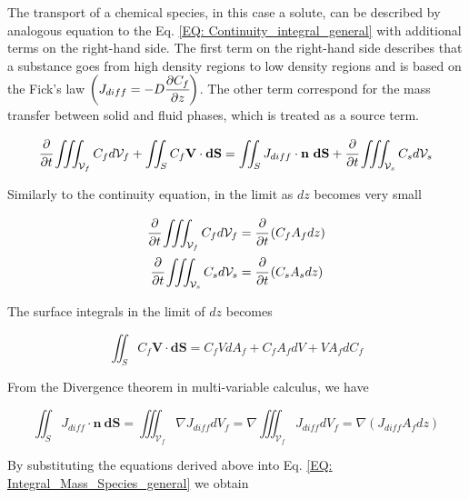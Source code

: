 \documentclass[../Parameter_fitting.tex]{subfiles}
\begin{document}
	The transport of a chemical species, in this case a solute, can be described by analogous equation to the Eq. \ref{EQ: Continuity_integral_general} with additional terms on the right-hand side. The first term on the right-hand side describes that a substance goes from high density regions to low density regions and is based on the Fick's law ${\footnotesize\left( J_{diff}=-D\cfrac{\partial C_f}{\partial z} \right)}$. The other term correspond for the mass transfer between solid and fluid phases, which is treated as a source term.
	
	{\footnotesize
		\begin{equation}
			\cfrac{\partial}{\partial t} \iiint_{\mathcal{V}_f} C_f d\mathcal{V}_f + \iint_S C_f \textbf{V} \cdot \textbf{dS} = \iint_S J_{diff} \cdot \textbf{n}~\textbf{dS} + \cfrac{\partial}{\partial t} \iiint_{\mathcal{V}_s} C_s d\mathcal{V}_s
			\label{EQ: Integral_Mass_Species_general}
		\end{equation}
	}
	
	Similarly to the continuity equation, in the limit as $dz$ becomes very small
	
	{\footnotesize
		\begin{align}
			\cfrac{\partial}{\partial t} \iiint_{\mathcal{V}_f} C_f d\mathcal{V}_f &= \cfrac{\partial}{\partial t}\left( C_f A_f dz \right) \\
			\cfrac{\partial}{\partial t} \iiint_{\mathcal{V}_s} C_s d\mathcal{V}_s &= \cfrac{\partial}{\partial t}\left( C_s A_s dz \right)
		\end{align}
	}

	The surface integrals in the limit of $dz$ becomes
	
	{\footnotesize
		\begin{equation}
			\iint_S C_f \textbf{V} \cdot \textbf{dS} = C_f V dA_f + C_f A_f dV + V A_f dC_f 
		\end{equation}
	}
	
	From the Divergence theorem in multi-variable calculus, we have
	
	{\footnotesize
		\begin{equation}
			\iint_S J_{diff} \cdot \textbf{n}~\textbf{dS} = \iiint_{\mathcal{V}_f} \nabla J_{diff} dV_f = \nabla \iiint_{\mathcal{V}_f} J_{diff} dV_f = \nabla \left( J_{diff} A_f dz \right)
		\end{equation}
	}
	
	By substituting the equations derived above into Eq. \ref{EQ: Integral_Mass_Species_general} we obtain
	
\end{document}
